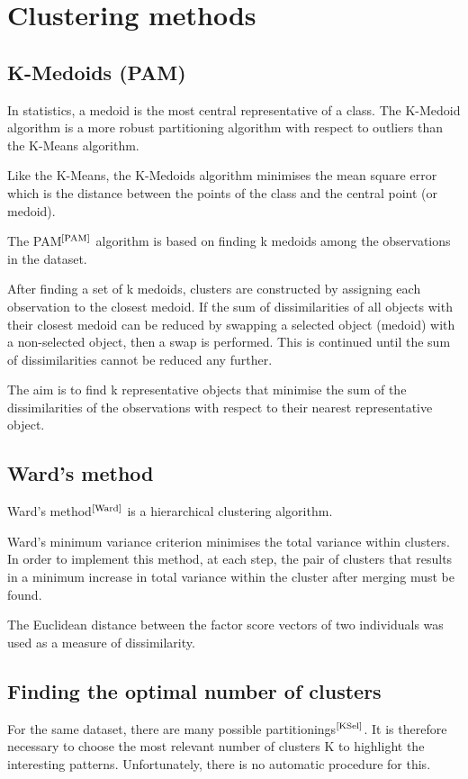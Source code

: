 \documentclass[12pt,a4paper,openany,UKenglish]{scrreprt}
\newcommand{\bib}[1]{$^\text{\cite{#1}}$}
\begin{document}
\section{Clustering methods}
\subsection{K-Medoids (PAM)}
In statistics, a medoid is the most central representative of a class. The K-Medoid algorithm is a more robust partitioning algorithm with respect to outliers than the K-Means algorithm.

Like the K-Means, the K-Medoids algorithm minimises the mean square error which is the distance between the points of the class and the central point (or medoid).

The PAM\bib{PAM} algorithm is based on finding k medoids among the observations in the dataset.

After finding a set of k medoids, clusters are constructed by assigning each observation to the closest medoid.
If the sum of dissimilarities of all objects with their closest medoid can be reduced by swapping a selected object (medoid) with a non-selected object, then a swap is performed. This is continued until the sum of dissimilarities cannot be reduced any further.

The aim is to find k representative objects that minimise the sum of the dissimilarities of the observations with respect to their nearest representative object.

\subsection{Ward's method}
Ward's method\bib{Ward} is a hierarchical clustering algorithm.

Ward's minimum variance criterion minimises the total variance within clusters. In order to implement this method, at each step, the pair of clusters that results in a minimum increase in total variance within the cluster after merging must be found.

The Euclidean distance between the factor score vectors of two individuals was used as a measure of dissimilarity.

\subsection{Finding the optimal number of clusters}
For the same dataset, there are many possible partitionings\bib{KSel}.
It is therefore necessary to choose the most relevant number of clusters K to highlight the interesting patterns.
Unfortunately, there is no automatic procedure for this.
\end{document}
